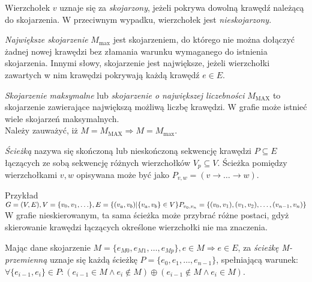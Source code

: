 \begin{definition}
  Wierzchołek $v$ uznaje się za \emph{skojarzony}, jeżeli pokrywa dowolną
  krawędź należącą do skojarzenia.
  W przeciwnym wypadku, wierzchołek jest \emph{nieskojarzony}.
\end{definition}

\begin{definition}
  \emph{Największe skojarzenie} $M_{\max}$ jest skojarzeniem, do którego nie można
  dołączyć żadnej nowej krawędzi bez złamania warunku wymaganego do istnienia
  skojarzenia. 
  Innymi słowy, skojarzenie jest największe, jeżeli wierzchołki zawartych w nim
  krawędzi pokrywają każdą krawędź $e \in E$.
\end{definition}

\begin{definition}
  \emph{Skojarzenie maksymalne} lub \emph{skojarzenie o największej liczebności}
  $M_{\textrm{MAX}}$ to skojarzenie zawierające największą możliwą liczbę krawędzi.
  W grafie może istnieć wiele skojarzeń maksymalnych.\\
  Należy zauważyć, iż $M=M_{\textrm{MAX}} \Rightarrow M=M_{\max}$.
\end{definition}

\begin{definition}
  \emph{Ścieżką} nazywa się skończoną lub nieskończoną sekwencję krawędzi 
  $P \subseteq E$ łączących ze sobą sekwencję różnych wierzchołków
  $V_p \subseteq V$.
  Ścieżka pomiędzy wierzchołkami $v,w$ opisywana może być jako $P_{v,w} = (v
  \rightarrow \ldots \rightarrow w)$.
  \begin{example}{Przykład}\\
    $G=(V,E), V=\{v_0, v_1, \ldots\}, E=\{(v_a, v_b)| \{v_a, v_b\} \in V\}\\
    P_{v_0, v_n}=\{(v_0, v_1), (v_1, v_2), \ldots, (v_{n-1}, v_n)\}$\\

    W grafie nieskierowanym, ta sama ścieżka może przybrać różne postaci, gdyż
    skierowanie krawędzi łączących określone wierzchołki nie ma znaczenia.
  \end{example}
\end{definition}

\begin{definition}
  Mając dane skojarzenie ${M=\{e_{M0}, e_{M1}, \ldots, e_{Mp}\}, e \in M \Rightarrow e \in E}$,
  za \emph{ścieżkę M-przemienną} uznaje się każdą ścieżkę $P=\{e_0, e_1, \ldots,
  e_{n-1}\}$, spełniającą warunek: 
  ${\forall{\{e_{i-1}, e_i\} \in P}: (e_{i-1} \in M \land e_{i} \notin M) \oplus
  (e_{i-1} \notin M \land e_{i} \in M)}$.
\end{definition}


